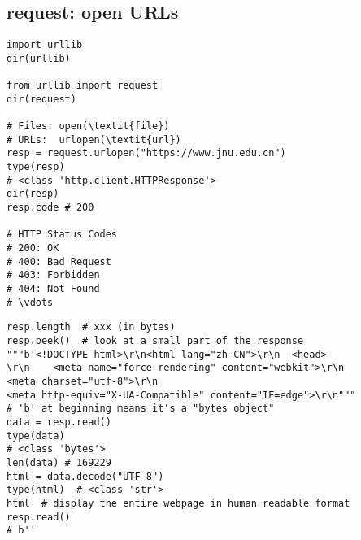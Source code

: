 \documentclass{beamer}
\begin{document}
\subsection{request: open URLs}

\begin{frame}[fragile]{}
\begin{verbatim}
import urllib
dir(urllib)

from urllib import request
dir(request)

# Files: open(\textit{file})
# URLs:  urlopen(\textit{url})
resp = request.urlopen("https://www.jnu.edu.cn")
type(resp)
# <class 'http.client.HTTPResponse'>
dir(resp)
resp.code # 200

# HTTP Status Codes
# 200: OK
# 400: Bad Request
# 403: Forbidden
# 404: Not Found
# \vdots
\end{verbatim}
\end{frame}

\begin{frame}[fragile]{}
\begin{verbatim}
resp.length  # xxx (in bytes)
resp.peek()  # look at a small part of the response
"""b'<!DOCTYPE html>\r\n<html lang="zh-CN">\r\n  <head>
\r\n    <meta name="force-rendering" content="webkit">\r\n
<meta charset="utf-8">\r\n    
<meta http-equiv="X-UA-Compatible" content="IE=edge">\r\n"""
# 'b' at beginning means it's a "bytes object"
data = resp.read()
type(data)
# <class 'bytes'>
len(data) # 169229
html = data.decode("UTF-8")
type(html)  # <class 'str'>
html  # display the entire webpage in human readable format
resp.read()
# b''
\end{verbatim}
\end{frame}
\end{document}
